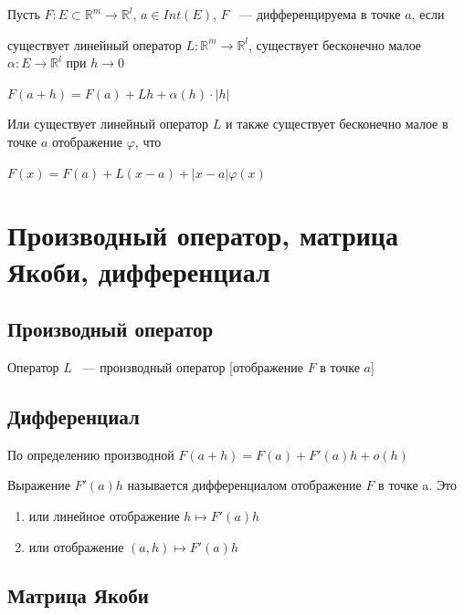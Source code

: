 \documentclass{article}
\begin{document}
        Пусть $F : E \subset \mathbb{R}^m \rightarrow \mathbb{R}^l$, $a \in Int(E)$, $F$ ~--- дифференцируема в точке $a$, если
        
        существует линейный оператор $L : \mathbb{R}^m \rightarrow \mathbb{R}^l$, существует бесконечно малое $\alpha : E \rightarrow \mathbb{R}^l$ при $h \rightarrow 0$
        
        $F(a + h) = F(a) + Lh + \alpha(h) \cdot |h|$
        
        Или существует линейный оператор $L$ и также существует бесконечно малое в точке $a$ отображение $\varphi$, что
        
        $F(x) = F(a) + L(x - a) + | x - a| \varphi(x)$
        
    \newpage
    
    \section{Производный оператор, матрица Якоби, дифференциал}
    
        \subsection{Производный оператор}
        
            Оператор $L$ ~--- производный оператор [отображение $F$ в точке $a$]
            
        \subsection{Дифференциал}
        
            По определению производной $F(a + h) = F(a) + F'(a)h + o(h)$
            
            Выражение $F'(a)h$ называется дифференциалом отображение $F$ в точке a. Это
            
            \begin{enumerate}
            
                \item или линейное отображение $h \mapsto F'(a) h$
                
                \item или отображение $(a, h) \mapsto F'(a) h$ 
                
            \end{enumerate}
            
        \subsection{Матрица Якоби}
        
\end{document}

